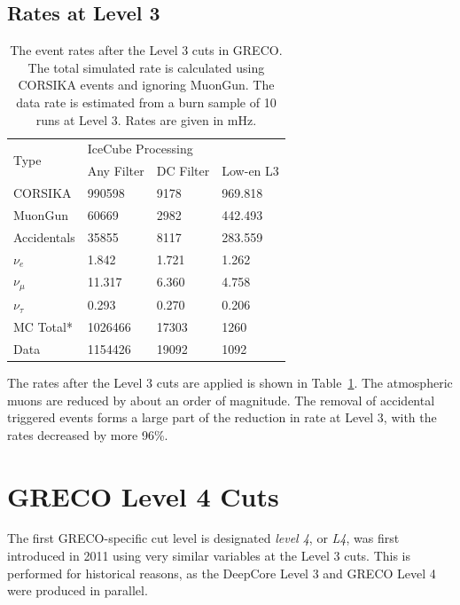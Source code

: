 \subsection{Rates at Level 3}
\begin{table}[]
\centering
\begin{tabular}{@{}llll@{}}
\toprule
\multirow{2}{*}{Type} & \multicolumn{3}{l}{IceCube Processing} \\
                      & Any Filter   & DC Filter  & Low-en L3  \\ \midrule
CORSIKA               & 990598       & 9178       & 969.818    \\
MuonGun               & 60669        & 2982       & 442.493    \\
Accidentals           & 35855        & 8117       & 283.559    \\
$\nu_e$               & 1.842        & 1.721      & 1.262      \\
$\nu_{\mu}$           & 11.317       & 6.360      & 4.758      \\
$\nu_{\tau}$          & 0.293        & 0.270      & 0.206      \\ \midrule
MC Total*             & 1026466      & 17303      & 1260       \\
Data                  & 1154426      & 19092      & 1092       \\ \bottomrule
\end{tabular}
\caption{The event rates after the Level 3 cuts in GRECO. The total simulated rate is calculated using CORSIKA events and ignoring MuonGun. The data rate is estimated from a burn sample of 10 runs at Level 3. Rates are given in mHz.}
\label{tab:event_rates_L3}
\end{table}

The rates after the Level 3 cuts are applied is shown in Table~\ref{tab:event_rates_L3}. 
The atmospheric muons are reduced by about an order of magnitude.
The removal of accidental triggered events forms a large part of the reduction in rate at Level 3, with the rates decreased by more 96\%.


\graphicspath{{chapters/greco/images/level4/}}
\label{sec:level4}
\section{GRECO Level 4 Cuts}
The first GRECO-specific cut level is designated \emph{level 4}, or \emph{L4}, was first introduced in 2011 using very similar variables at the Level 3 cuts.
This is performed for historical reasons, as the DeepCore Level 3 and GRECO Level 4 were produced in parallel.

